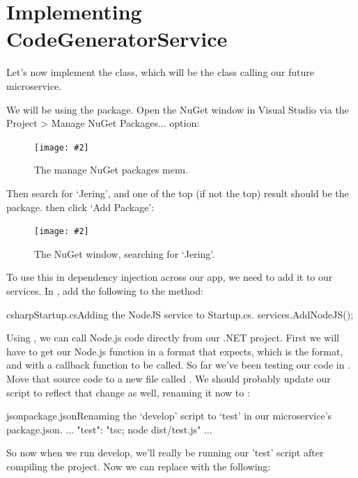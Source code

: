 \documentclass[a4paper,headinclude=on,footinclude=on,12pt,oneside]{scrbook}
\newcommand{\standardfigure}[3]{\begin{figure}[H]\begin{center}\texttt{[image: \#2]}\caption{#3}\label{fig:#2}\end{center}\end{figure}}
\begin{document}
\section{Implementing CodeGeneratorService}

Let's now implement the  class, which will be the class calling our future microservice.


We will be using the  package. Open the NuGet window in Visual Studio via the Project > Manage NuGet Packages... option:

\standardfigure{\textwidth}{backend/manage-nuget-packages}{The manage NuGet packages menu.}

Then search for `Jering', and one of the top (if not the top) result should be the  package. then click `Add Package':

\standardfigure{\textwidth}{backend/jering-package}{The NuGet window, searching for `Jering'.}

To use this in dependency injection across our app, we need to add it to our services. In , add the following to the  method:

\begin{codeInput}{csharp}{Startup.cs}{Adding the NodeJS service to Startup.cs.}
services.AddNodeJS();
\end{codeInput}

Using , we can call Node.js code directly from our .NET project. First we will have to get our Node.js function in a format that  expects, which is the  format, and with a callback function to be called. So far we've been testing our code in . Move that source code to a new file called . We should probably update our  script to reflect that change as well, renaming it now to :

\begin{codeInput}{json}{package.json}{Renaming the `develop' script to `test' in our microservice's package.json.}
...
"test": "tsc; node dist/test.js"
...
\end{codeInput}

So now when we run develop, we'll really be running our 'test' script after compiling the project. Now we can replace  with the following:
\end{document}
